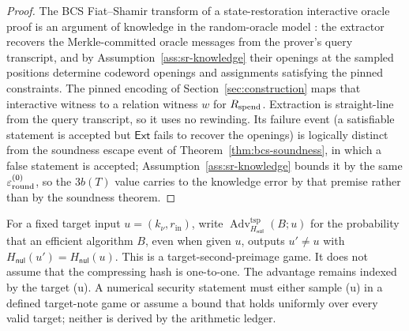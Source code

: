 \begin{proof}
The BCS Fiat--Shamir transform of a state-restoration interactive oracle proof
is an argument of knowledge in the random-oracle model
\citep{BenSassonChiesaSpooner2016}: the extractor recovers the Merkle-committed
oracle messages from the prover's query transcript, and by
Assumption~\ref{ass:sr-knowledge} their openings at the sampled positions
determine codeword openings and assignments satisfying the pinned constraints.
The pinned encoding of Section~\ref{sec:construction} maps that interactive
witness to a relation witness \(w\) for \(R_{\mathrm{spend}}\).  Extraction is
straight-line from the query transcript, so it uses no rewinding.  Its failure
event (a satisfiable statement is accepted but \(\mathsf{Ext}\) fails to
recover the openings) is logically distinct from the soundness escape event
of Theorem~\ref{thm:bcs-soundness}, in which a false statement is accepted;
Assumption~\ref{ass:sr-knowledge} bounds it by the same
\(\varepsilon_{\rm round}^{(0)}\), so the \(3b(T)\) value carries to the
knowledge error by that premise rather than by the soundness theorem.
\end{proof}

For a fixed target input \(u=(k_\nu,r_{\mathrm{in}})\), write
\(\operatorname{Adv}^{\mathrm{tsp}}_{H_{\mathsf{nul}}}(B;u)\) for the
probability that an efficient algorithm \(B\), even when given \(u\), outputs
\(u'\ne u\) with \(H_{\mathsf{nul}}(u')=H_{\mathsf{nul}}(u)\).  This is a
target-second-preimage game.  It does not assume that the compressing hash is
one-to-one.  The advantage remains indexed by the target (u).  A numerical
security statement must either sample (u) in a defined target-note game or
assume a bound that holds uniformly over every valid target; neither is
derived by the arithmetic ledger.


